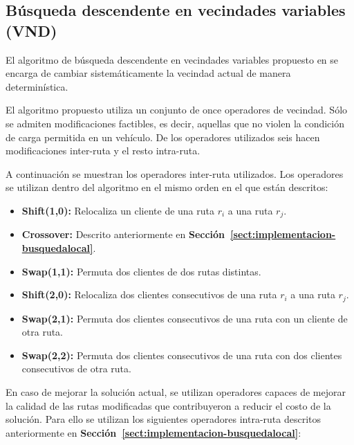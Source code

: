 \subsection{Búsqueda descendente en vecindades variables (VND)} \label{sect:implementacion-vnd}

El algoritmo de búsqueda descendente en vecindades variables propuesto en \cite{VNDimp} se encarga de cambiar sistemáticamente la vecindad actual de manera determinística.
 
El algoritmo propuesto utiliza un conjunto de once operadores de vecindad. Sólo se admiten modificaciones factibles, es decir, aquellas que no violen la condición de carga permitida en un vehículo. De los operadores utilizados seis hacen modificaciones inter-ruta y el resto intra-ruta.

A continuación se muestran los operadores inter-ruta utilizados. Los operadores se utilizan dentro del algoritmo en el mismo orden en el que están descritos:

\begin{itemize}

\item \textbf{Shift(1,0):} Relocaliza un cliente de una ruta $r_i$ a una ruta $r_j$.

\item \textbf{Crossover:} Descrito anteriormente en \textbf{Sección~\ref{sect:implementacion-busquedalocal}}.

\item \textbf{Swap(1,1):} Permuta dos clientes de dos rutas distintas.

\item \textbf{Shift(2,0):} Relocaliza dos clientes consecutivos de una ruta $r_i$ a una ruta $r_j$.

\item \textbf{Swap(2,1):} Permuta dos clientes consecutivos de una ruta con un cliente de otra ruta.

\item \textbf{Swap(2,2):} Permuta dos clientes consecutivos de una ruta con dos clientes consecutivos de otra ruta.

\end{itemize}

En caso de mejorar la solución actual, se utilizan operadores capaces de mejorar la calidad de las rutas mo\-di\-fi\-ca\-das que contribuyeron a reducir el costo de la solución. Para ello se utilizan los siguientes operadores intra-ruta descritos anteriormente en \textbf{Sección~\ref{sect:implementacion-busquedalocal}}:

